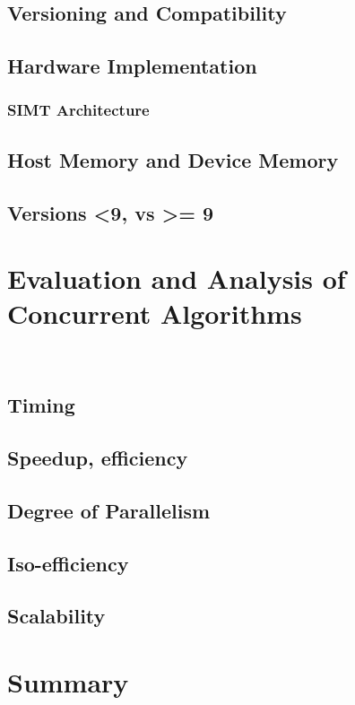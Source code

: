 \subsection{Versioning and Compatibility}%
\subsection{Hardware Implementation}%
\subsubsection{SIMT Architecture}%
\subsection{Host Memory and Device Memory}
\subsection{Versions <9, vs >= 9}
%
%
%
%
%
\section{Evaluation and Analysis of Concurrent Algorithms}~\cite[p.~330]{Lang17}
%
\subsection{Timing}
%
\subsection{Speedup, efficiency}


%
\subsection{Degree of Parallelism}
%
\subsection{Iso-efficiency}
%
\subsection{Scalability}
%
%
%
%
%
\section{Summary}
%
